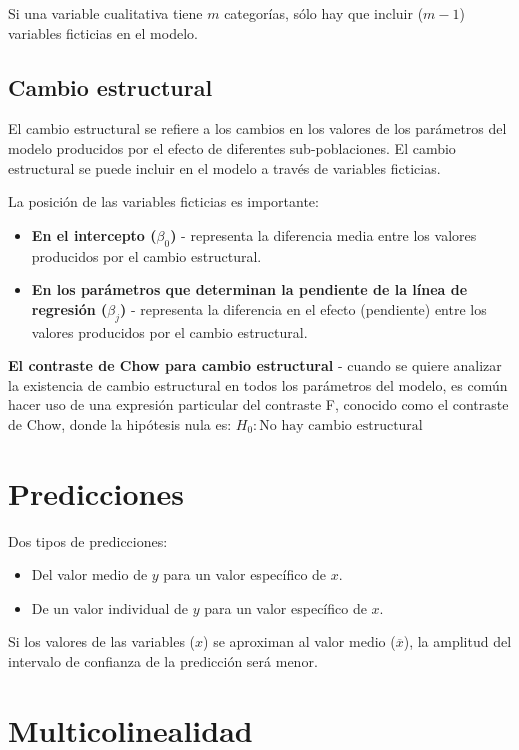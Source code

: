 \documentclass[10pt, a4paper, landscape]{extarticle}
\begin{document}
\begin{multicols}{3}
Si una variable cualitativa tiene $m$ categorías, sólo hay que incluir ($m-1$) variables ficticias en el modelo.

\subsection*{Cambio estructural}

El cambio estructural se refiere a los cambios en los valores de los parámetros del modelo producidos por el efecto de diferentes sub-poblaciones. El cambio estructural se puede incluir en el modelo a través de variables ficticias.

La posición de las variables ficticias es importante:
\begin{itemize}[leftmargin=*]
\item \textbf{En el intercepto ($\beta_0$)} - representa la diferencia media entre los valores producidos por el cambio estructural.
\item \textbf{En los parámetros que determinan la pendiente de la línea de regresión ($\beta_j$)} - representa la diferencia en el efecto (pendiente) entre los valores producidos por el cambio estructural.
\end{itemize}

\textbf{El contraste de Chow para cambio estructural} - cuando se quiere analizar la existencia de cambio estructural en todos los parámetros del modelo, es común hacer uso de una expresión particular del contraste F, conocido como el contraste de Chow, donde la hipótesis nula es: $H_0: \text{No hay cambio estructural}$

\section*{Predicciones}

Dos tipos de predicciones:

\begin{itemize}[leftmargin=*]
\item Del valor medio de $y$ para un valor específico de $x$.
\item De un valor individual de $y$ para un valor específico de $x$.
\end{itemize}

Si los valores de las variables ($x$) se aproximan al valor medio ($\overline{x}$), la amplitud del intervalo de confianza de la predicción será menor. 

\columnbreak

\section*{Multicolinealidad}


\end{multicols}
\end{document}
